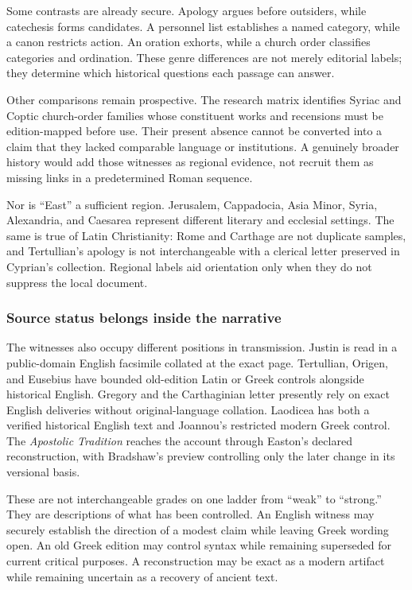 Some contrasts are already secure. Apology argues before outsiders, while
catechesis forms candidates. A personnel list establishes a named category,
while a canon restricts action. An oration exhorts, while a church order
classifies categories and ordination. These genre differences are not merely
editorial labels; they determine which historical questions each passage can
answer.

Other comparisons remain prospective. The research matrix identifies Syriac
and Coptic church-order families whose constituent works and recensions must
be edition-mapped before use. Their present absence cannot be converted into a
claim that they lacked comparable language or institutions. A genuinely
broader history would add those witnesses as regional evidence, not recruit
them as missing links in a predetermined Roman sequence.

Nor is ``East'' a sufficient region. Jerusalem, Cappadocia, Asia Minor, Syria,
Alexandria, and Caesarea represent different literary and ecclesial settings.
The same is true of Latin Christianity: Rome and Carthage are not duplicate
samples, and Tertullian's apology is not interchangeable with a clerical
letter preserved in Cyprian's collection. Regional labels aid orientation
only when they do not suppress the local document.

\subsubsection{Source status belongs inside the narrative}

The witnesses also occupy different positions in transmission. Justin is read
in a public-domain English facsimile collated at the exact page. Tertullian,
Origen, and Eusebius have bounded old-edition Latin or Greek controls alongside
historical English. Gregory and the Carthaginian letter presently rely on
exact English deliveries without original-language collation. Laodicea has
both a verified historical English text and Joannou's restricted modern Greek
control. The \emph{Apostolic Tradition} reaches the account through Easton's
declared reconstruction, with Bradshaw's preview controlling only the later
change in its versional basis.

These are not interchangeable grades on one ladder from ``weak'' to
``strong.'' They are descriptions of what has been controlled. An English
witness may securely establish the direction of a modest claim while leaving
Greek wording open. An old Greek edition may control syntax while remaining
superseded for current critical purposes. A reconstruction may be exact as a
modern artifact while remaining uncertain as a recovery of ancient text.

